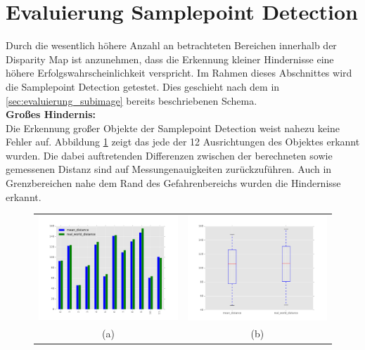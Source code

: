 \section{Evaluierung Samplepoint Detection}
\label{sec:evaluierung_samplepoint}
	
	Durch die wesentlich höhere Anzahl an betrachteten Bereichen innerhalb der Disparity Map ist anzunehmen, dass die Erkennung kleiner Hindernisse eine höhere Erfolgswahrscheinlichkeit verspricht. Im Rahmen dieses Abschnittes wird die Samplepoint Detection getestet. Dies geschieht nach dem in \ref{sec:evaluierung_subimage} bereits beschriebenen Schema.\\

	\noindent
	\textbf{Großes Hindernis:}\\
	Die Erkennung großer Objekte der Samplepoint Detection weist nahezu keine Fehler auf. Abbildung \ref{fig:sample_eval_big} zeigt das jede der 12 Ausrichtungen des Objektes erkannt wurden. Die dabei auftretenden Differenzen zwischen der berechneten sowie gemessenen Distanz sind auf Messungenauigkeiten zurückzuführen. Auch in Grenzbereichen nahe dem Rand des Gefahrenbereichs wurden die Hindernisse erkannt. 
	
    \begin{figure}[h]
		\centering
		\begin{tabular}{cc}
		\includegraphics[width=7cm]{img/evaluation/sample_big_bar}&
		\includegraphics[width=7cm]{img/evaluation/sample_big_box}\\
		 (a) & (b)
		\end{tabular}
		\caption{}
	    \label{fig:sample_eval_big}
	\end{figure}

